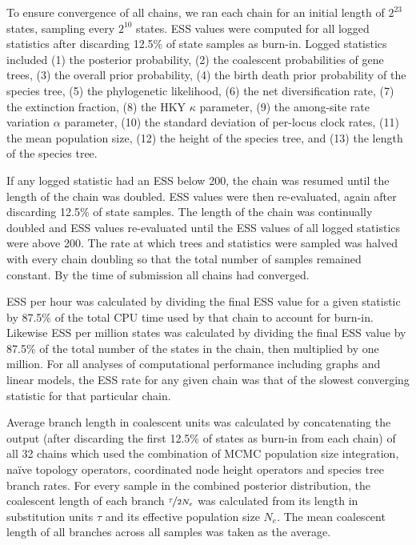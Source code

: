 \documentclass[nogrid]{MBE}%
\begin{document}
To ensure convergence of all chains, we ran each chain for an initial length of
$2^{23}$ states, sampling every $2^{10}$ states. ESS values were computed for
all logged statistics after discarding 12.5\% of state samples as burn-in.
Logged statistics included (1) the posterior probability, (2) the coalescent
probabilities of gene trees, (3) the overall prior probability, (4) the birth
death prior probability of the species tree, (5) the phylogenetic likelihood,
(6) the net diversification rate, (7) the extinction fraction, (8) the HKY
$\kappa$ parameter, (9) the among-site rate variation $\alpha$ parameter, (10)
the standard deviation of per-locus clock rates, (11) the mean population size,
(12) the height of the species tree, and (13) the length of the species tree.

If any logged statistic had an ESS below 200, the chain was resumed until the
length of the chain was doubled. ESS values were then re-evaluated, again after
discarding 12.5\% of state samples. The length of the chain was continually
doubled and ESS values re-evaluated until the ESS values of all logged
statistics were above 200. The rate at which trees and statistics were sampled
was halved with every chain doubling so that the total number of samples
remained constant. By the time of submission all chains had converged.

ESS per hour was calculated by dividing the final ESS value for a given
statistic by 87.5\% of the total CPU time used by that chain to account for
burn-in. Likewise ESS per million states was calculated by dividing the final
ESS value by 87.5\% of the total number of the states in the chain, then
multiplied by one million. For all analyses of computational performance
including graphs and linear models, the ESS rate for any given chain was that of
the slowest converging statistic for that particular chain.

Average branch length in coalescent units was calculated by concatenating the
output (after discarding the first 12.5\% of states as burn-in from each chain) of all 32 chains
which used the combination of MCMC population size integration, na\"ive topology
operators, coordinated node height operators and species tree branch rates. For
every sample in the combined posterior distribution, the coalescent length of
each branch $\nicefrac{\tau}{2N_e}$ was calculated from its length in
substitution units $\tau$ and its effective population size $N_e$. The mean
coalescent length of all branches across all samples was taken as the average.
\end{document}
